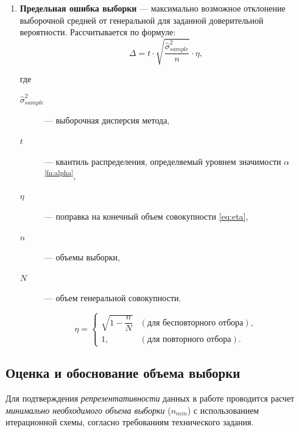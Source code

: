 \begin{enumerate}
    \clearpage
    
    \item \textbf{Предельная ошибка выборки} --- максимально возможное отклонение выборочной средней от 
    генеральной для заданной доверительной вероятности. Рассчитывается по формуле:
    \begin{equation}
        \label{eq:delta_error}
        \Delta = t \cdot \sqrt{\frac{\hat{\sigma}_{sample}^2}{n}} \cdot \eta  ,
    \end{equation}
    
    где
    \begin{description}
        \item[$\hat{\sigma}_{sample}^2$] --- выборочная дисперсия метода,
        \item[$t$] --- квантиль распределения, определяемый уровнем
        значимости $\alpha$\textsuperscript{\ref{fn:alpha}},
        \item[$\eta$] --- поправка на конечный объем совокупности \eqref{eq:eta},
        \item[$n$] --- объемы выборки,
        \item[$N$] --- объем генеральной совокупности. 
    \end{description}


    \begin{equation}
        \label{eq:eta}
        \eta = 
        \begin{cases} 
        \sqrt{1-\dfrac{n}{N}} & (\text{для бесповторного отбора}), \\
        1, & (\text{для повторного отбора}).
        \end{cases}
    \end{equation}

\end{enumerate}



\subsection{Оценка и обоснование объема выборки}

Для подтверждения \textit{репрезентативности} данных в работе проводится расчет \textit{минимально необходимого объема выборки} ($n_{min}$) с использованием итерационной схемы, согласно требованиям технического задания.



